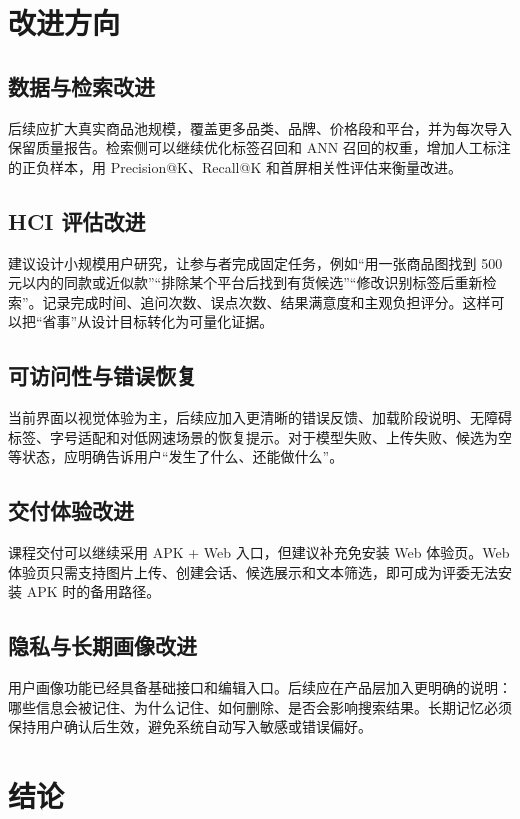 \documentclass[UTF8,a4paper,zihao=-4]{ctexart}
\begin{document}
\section{改进方向}

\subsection{数据与检索改进}

后续应扩大真实商品池规模，覆盖更多品类、品牌、价格段和平台，并为每次导入保留质量报告。检索侧可以继续优化标签召回和 ANN 召回的权重，增加人工标注的正负样本，用 Precision@K、Recall@K 和首屏相关性评估来衡量改进。

\subsection{HCI 评估改进}

建议设计小规模用户研究，让参与者完成固定任务，例如“用一张商品图找到 500 元以内的同款或近似款”“排除某个平台后找到有货候选”“修改识别标签后重新检索”。记录完成时间、追问次数、误点次数、结果满意度和主观负担评分。这样可以把“省事”从设计目标转化为可量化证据。

\subsection{可访问性与错误恢复}

当前界面以视觉体验为主，后续应加入更清晰的错误反馈、加载阶段说明、无障碍标签、字号适配和对低网速场景的恢复提示。对于模型失败、上传失败、候选为空等状态，应明确告诉用户“发生了什么、还能做什么”。

\subsection{交付体验改进}

课程交付可以继续采用 APK + Web 入口，但建议补充免安装 Web 体验页。Web 体验页只需支持图片上传、创建会话、候选展示和文本筛选，即可成为评委无法安装 APK 时的备用路径。

\subsection{隐私与长期画像改进}

用户画像功能已经具备基础接口和编辑入口。后续应在产品层加入更明确的说明：哪些信息会被记住、为什么记住、如何删除、是否会影响搜索结果。长期记忆必须保持用户确认后生效，避免系统自动写入敏感或错误偏好。

\section{结论}
\end{document}
